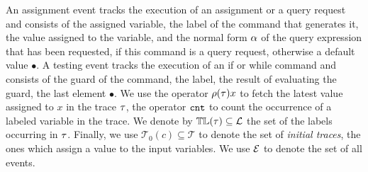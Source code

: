 An assignment event tracks the execution of an assignment  or a query request and consists of the assigned variable, the label of the command that generates it, the value assigned to the variable, and the normal form  $\alpha$ of the query expression that has been requested, if this command is a query request, otherwise a default value $\bullet$.
A testing event tracks the execution of an if or while command and consists of the guard of the command, the label, the result of evaluating the guard, the last element $\bullet$. 
 We use the operator $\rho (\mathtt{\tau}) x$ to fetch the latest value assigned to  $x$ in the trace $\mathtt{\tau}$, the operator
$\mathtt{cnt}$ to count the occurrence of a labeled variable in the trace. 
We denote by $\mathbb{TL}(\mathtt{\tau}) \subseteq \mathcal{L}$ the set of the labels occurring in $\mathtt{\tau}$.
Finally, we use $\mathcal{T}_0(c) \subseteq \mathcal{T}$ to denote the set of \emph{initial traces}, the ones
which assign a value to the input variables. We use $\mathcal{E}$ to denote the set of all events.



